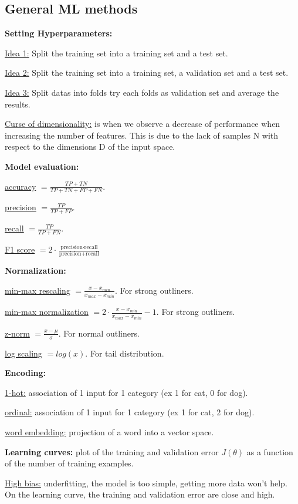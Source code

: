 \subsection*{General ML methods}
\noindent
\textbf{Setting Hyperparameters:}

\underline{Idea 1:} Split the training set into a training set and a test set.

\underline{Idea 2:} Split the training set into a training set, a validation set and a test set.

\underline{Idea 3:} Split datas into folds try each folds as validation set and average the results.

\underline{Curse of dimensionality:} is when we observe a decrease of
performance when increasing the number of features. This is due to the
lack of samples N with respect to the dimensions D of the input space.

\textbf{Model evaluation:}

\underline{accuracy} $= \frac{TP + TN}{TP + TN + FP + FN}$.

\underline{precision} $= \frac{TP}{TP + FP}$.

\underline{recall} $= \frac{TP}{TP + FN}$.

\underline{F1 score} $= 2\cdot\frac{\text{precision}\cdot \text{recall}}{\text{precision} + \text{recall}}$

\textbf{Normalization:}

\underline{min-max rescaling} $= \frac{x - x_{min}}{x_{max} - x_{min}}$.
For strong outliners.

\underline{min-max normalization} $= 2\cdot \frac{x - x_{min}}{x_{max} - x_{min}}-1$.
For strong outliners.

\underline{z-norm} $= \frac{x - \mu}{\sigma}$.
For normal outliners.

\underline{log scaling} $= log(x)$.
For tail distribution.

\textbf{Encoding:}

\underline{1-hot:} association of 1 input for 1 category (ex 1 for cat, 0 for dog).

\underline{ordinal:} association of 1 input for 1 category (ex 1 for cat, 2 for dog).

\underline{word embedding:} projection of a word into a vector space.

\textbf{Learning curves:} plot of the training and validation error $J(\theta)$ as a
function of the number of training examples.

\underline{High bias:} underfitting, the model is too simple, getting more data won't help.
On the learning curve, the training and validation error are close and high.

